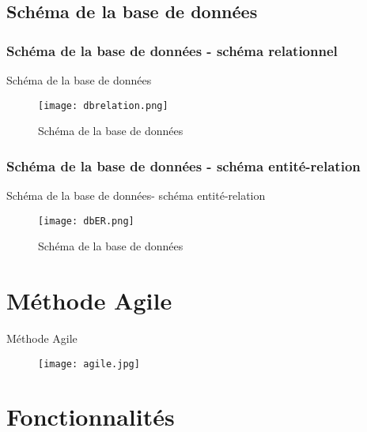 \documentclass[numbering=fraction,10pt]{beamer}
\begin{document}
\subsection{Schéma de la base de données}
\subsubsection{Schéma de la base de données - schéma relationnel}
\begin{frame}{Schéma de la base de données}
    \begin{figure}
        \centering
        \texttt{[image: dbrelation.png]}
        \caption{Schéma de la base de données}
    \end{figure}
\end{frame}
\subsubsection{Schéma de la base de données - schéma entité-relation}
\begin{frame}{Schéma de la base de données- schéma entité-relation}
    \begin{figure}
        \centering
        \texttt{[image: dbER.png]}
        \caption{Schéma de la base de données}
    \end{figure}
\end{frame}
\section{Méthode Agile}
\begin{frame}{Méthode Agile}
    \begin{figure}
        \centering
        \texttt{[image: agile.jpg]}
        
    \end{figure}
\end{frame}
\section{Fonctionnalités}
\end{document}
